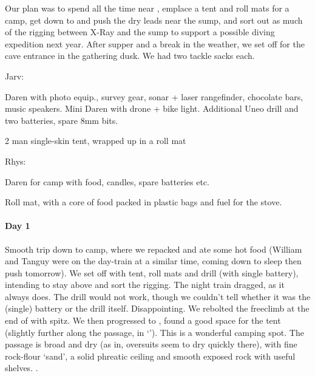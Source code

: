 Our plan was to spend all the time near , emplace a tent and roll mats for a camp, get down to  and push the dry leads near the sump, and sort out as much of the rigging between X-Ray and the sump to support a possible diving expedition next year.
After supper and a break in the weather, we set off for the cave entrance in the gathering dusk. We had two tackle sacks each.

Jarv:
\begin{citemize}
\item Daren with photo equip., survey gear, sonar + laser rangefinder, chocolate bars, music speakers. Mini Daren with drone + bike light. Additional Uneo drill and two batteries, spare 8mm bits.
\item 2 man single-skin tent, wrapped up in a roll mat
\end{citemize}

Rhys:
\begin{citemize}
\item Daren for camp with food, candles, spare batteries etc.
\item Roll mat, with a core of food packed in plastic bags and fuel for the stove.
\end{citemize}


\paragraph{Day 1}
Smooth trip down to camp, where we repacked and ate some hot food (William and Tanguy were on the day-train at a similar time, coming down to sleep then push tomorrow).
We set off with tent, roll mats and drill (with single battery), intending to stay above  and sort the rigging.
The night train dragged, as it always does. The drill would not work, though we couldn't tell whether it was the (single) battery or the drill itself. Disappointing. We rebolted the freeclimb at the end of  with spitz.
We then progressed to , found a good space for the tent (slightly further along the passage, in `'). This is a wonderful camping spot. The passage is broad and dry (as in, oversuits seem to dry quickly there), with fine rock-flour `sand', a solid phreatic ceiling and smooth exposed rock with useful shelves. .

